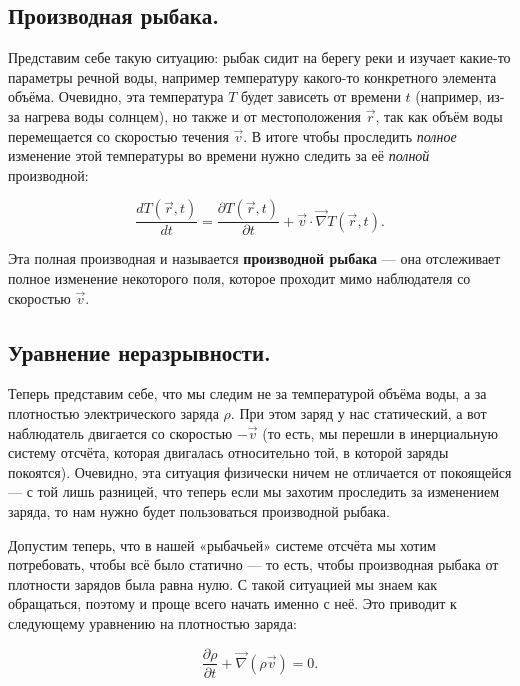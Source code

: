 \documentclass[a4paper,12pt]{article}
\newcommand{\pt}{\partial}
\newcommand{\vn}{\vec{\nabla}}
\begin{document}
\subsection{Производная рыбака.}
\label{sec:material_derivative}

Представим себе такую ситуацию: рыбак сидит на берегу реки и изучает
какие-то параметры речной воды, например температуру какого-то
конкретного элемента объёма. Очевидно, эта температура $T$ будет
зависеть от времени $t$ (например, из-за нагрева воды солнцем), но
также и от местоположения $\vec{r}$, так как объём воды перемещается
со скоростью течения $\vec{v}$. В итоге чтобы проследить
\textit{полное} изменение этой температуры во времени нужно следить за
её \textit{полной} производной: 

\begin{equation}
  \label{eq:def_material_derivative}
  \frac{d T(\vec{r},t)}{dt} = \frac{\pt T (\vec{r},t)}{\pt t} +
  \vec{v} \cdot \vn T (\vec{r},t).
\end{equation}

Эта полная производная и называется \textbf{производной рыбака} — она
отслеживает полное изменение некоторого поля, которое проходит мимо
наблюдателя со скоростью $\vec{v}$. 

\subsection{Уравнение неразрывности.}
\label{sec:cont_eq}

Теперь представим себе, что мы следим не за температурой объёма воды,
а за плотностью электрического заряда $\rho$. При этом заряд у нас
статический, а вот наблюдатель двигается со скоростью $-\vec{v}$ (то
есть, мы перешли в инерциальную систему отсчёта, которая двигалась
относительно той, в которой заряды покоятся). Очевидно, эта ситуация
физически ничем не отличается от покоящейся — с той лишь разницей, что
теперь если мы захотим проследить за изменением заряда, то нам нужно
будет пользоваться производной рыбака. 

Допустим теперь, что в нашей «рыбачьей» системе отсчёта мы хотим
потребовать, чтобы всё было статично — то есть, чтобы производная
рыбака от плотности зарядов была равна нулю. С такой ситуацией мы
знаем как обращаться, поэтому и проще всего начать именно с неё. Это
приводит к следующему уравнению на плотностью заряда: 

\begin{equation}
  \label{eq:cont_charge_1}
  \frac{\pt \rho}{\pt t} + \vn ( \rho \vec{v}) =0.
\end{equation}
\end{document}
